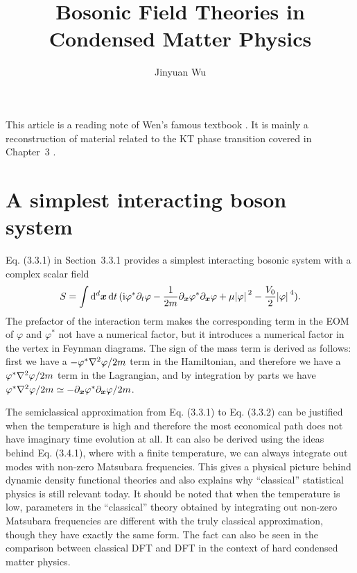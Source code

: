 \documentclass[hyperref, a4paper]{article}
\title{Bosonic Field Theories in Condensed Matter Physics}
\author{Jinyuan Wu}
\newcommand*{\ii}{\mathrm{i}}
\begin{document}
\maketitle

This article is a reading note of Wen's famous textbook \cite{Wen2007}. 
It is mainly a reconstruction of material related to the KT phase transition covered in Chapter~3 . 

\section{A simplest interacting boson system}

Eq. (3.3.1) in Section~3.3.1 provides a simplest interacting bosonic system with a complex scalar field 
\begin{equation}
    S = \int \dd[d]{\vb*{x}} \dd{t} (\ii \varphi^* \partial_t \varphi - \frac{1}{2m} \partial_{\vb*{x}} \varphi^* \partial_{\vb*{x}} \varphi + \mu \abs*{\varphi}^2 - \frac{V_0}{2} \abs*{\varphi}^4).
    \label{eq:bosonic}
\end{equation}
The prefactor of the interaction term makes the corresponding term in the EOM of $\varphi$ and $\varphi^*$ not 
have a numerical factor, but it introduces a numerical factor in the vertex in Feynman diagrams. The sign of 
the mass term is derived as follows: first we have a $- \varphi^* \laplacian \varphi / 2m$ term in the 
Hamiltonian, and therefore we have a $\varphi^* \laplacian \varphi / 2m$ term in the Lagrangian, and by 
integration by parts we have $\varphi^* \laplacian \varphi / 2m \simeq - \partial_{\vb*{x}} \varphi^* 
\partial_{\vb*{x}} \varphi / 2m$. 

The semiclassical approximation from Eq. (3.3.1) to Eq. (3.3.2) can be justified when the temperature is high 
and therefore the most economical path does not have imaginary time evolution at all. It can also 
be derived using the ideas behind Eq. (3.4.1), where with a finite temperature, we can always integrate 
out modes with non-zero Matsubara frequencies. This gives a physical picture behind dynamic density 
functional theories and also explains why ``classical'' statistical physics is still relevant today.
It should be noted that when the temperature is low, parameters in the ``classical'' theory obtained 
by integrating out non-zero Matsubara frequencies are different with the truly classical approximation,
though they have exactly the same form. The fact can also be seen in the comparison between classical DFT 
and DFT in the context of hard condensed matter physics. 
\end{document}
